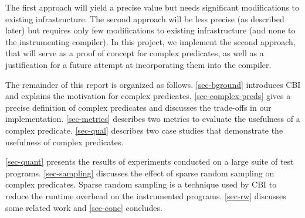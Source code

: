 The first approach will yield a precise value but needs significant modifications to existing infrastructure.  The second approach will be less precise (as described later) but requires only few modifications to existing infrastructure (and none to the instrumenting compiler).  In this project, we implement the second approach, that will serve as a proof of concept for complex predicates, as well as a justification for a future attempt at incorporating them into the compiler.

The remainder of this report is organized as follows.  \autoref{sec-bground} introduces CBI and explains the motivation for complex predicates.  \autoref{sec-complex-preds} gives a precise definition of complex predicates and discusses the trade-offs in our implementation.  \autoref{sec-metrics} describes two metrics to evaluate the usefulness of a complex predicate.  \autoref{sec-qual} describes two case studies that demonstrate the usefulness of complex predicates.  

\autoref{sec-quant} presents the results of experiments conducted on a large suite of test programs.  \autoref{sec-sampling} discusses the effect of sparse random sampling on complex predicates.  Sparse random sampling is a technique used by CBI to reduce the runtime overhead on the instrumented programs.  \autoref{sec-rw} discusses some related work and \autoref{sec-conc} concludes.
